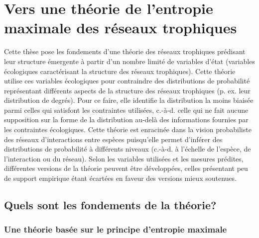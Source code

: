 
\section{Vers une théorie de l'entropie maximale des réseaux trophiques}

Cette thèse pose les fondements d'une théorie des réseaux trophiques prédisant
leur structure émergente à partir d'un nombre limité de variables d'état
(variables écologiques caractérisant la structure des réseaux trophiques). Cette
théorie utilise ces variables écologiques pour contraindre des distributions de
probabilité représentant différents aspects de la structure des réseaux
trophiques (p. ex. leur distribution de degrés). Pour ce faire, elle identifie
la distribution la moins biaisée parmi celles qui satisfont les contraintes
utilisées, c.-à-d. celle qui ne fait aucune supposition sur la forme de la
distribution au-delà des informations fournies par les contraintes écologiques.
Cette théorie est enracinée dans la vision probabiliste des réseaux
d'interactions entre espèces puisqu'elle permet d'inférer des distributions de
probabilité à différents niveaux (c.-à-d. à l'échelle de l'espèce, de
l'interaction ou du réseau). Selon les variables utilisées et les mesures
prédites, différentes versions de la théorie peuvent être développées, celles
présentant peu de support empirique étant écartées en faveur des versions mieux
soutenues.

\subsection{Quels sont les fondements de la théorie?} 

\subsubsection{Une théorie basée sur le principe d'entropie maximale} 

